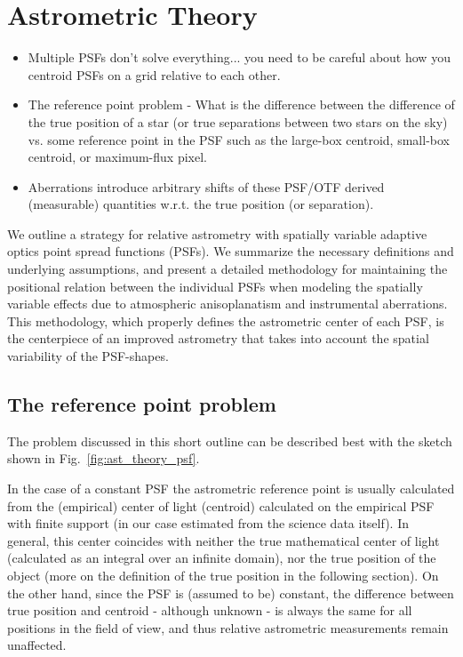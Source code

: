\section{Astrometric Theory}
\label{sec:astrometric_theory}

\begin{itemize}
\item Multiple PSFs don't solve everything... you need to be careful about how you centroid PSFs on a grid relative to each other. 
\item The reference point problem - What is the difference between the difference of the true position of a star (or true separations between two stars on the sky) vs. some reference point in the PSF such as the large-box centroid, small-box centroid, or maximum-flux pixel. 
\item Aberrations introduce arbitrary shifts of these PSF/OTF derived (measurable) quantities w.r.t. the true position (or separation).
\end{itemize}
  
We outline a strategy for relative astrometry with spatially variable adaptive optics point spread functions (PSFs). We summarize the necessary definitions and underlying assumptions, and present a detailed methodology for maintaining the positional relation between the individual PSFs when modeling the spatially variable effects due to atmospheric anisoplanatism and instrumental aberrations. This methodology, which properly defines the astrometric center of each PSF, is the centerpiece of an improved astrometry that takes into account the spatial variability of the PSF-shapes.

\subsection{The reference point problem}

The problem discussed in this short outline can be described best with the sketch shown in Fig.~\ref{fig:ast_theory_psf}. 

In the case of a constant PSF the astrometric reference point is usually calculated from the (empirical) center of light (centroid) calculated on the empirical PSF with finite support (in our case estimated from the science data itself). In general, this center coincides with neither the true mathematical center of light (calculated as an integral over an infinite domain), nor the true position of the object (more on the definition of the true position in the following section). On the other hand, since the PSF is (assumed to be) constant, the difference between true position and centroid - although unknown - is always the same for all positions in the field of view, and thus relative astrometric measurements remain unaffected.

